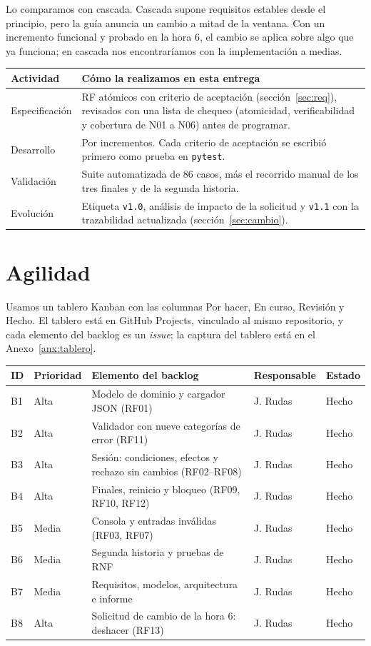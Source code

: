 \documentclass[11pt,letterpaper]{article}
\newcommand{\cod}[1]{\texttt{#1}}
\begin{document}
Lo comparamos con cascada. Cascada supone requisitos estables desde el principio, pero la guía anuncia un cambio a mitad de la ventana. Con un incremento funcional y probado en la hora 6, el cambio se aplica sobre algo que ya funciona; en cascada nos encontraríamos con la implementación a medias.

\begin{tabularx}{\linewidth}{@{}lL@{}}
\toprule
Actividad & Cómo la realizamos en esta entrega\\ \midrule
Especificación & RF atómicos con criterio de aceptación (sección~\ref{sec:req}), revisados con una lista de chequeo (atomicidad, verificabilidad y cobertura de N01 a N06) antes de programar.\\
Desarrollo & Por incrementos. Cada criterio de aceptación se escribió primero como prueba en \cod{pytest}.\\
Validación & Suite automatizada de 86 casos, más el recorrido manual de los tres finales y de la segunda historia.\\
Evolución & Etiqueta \cod{v1.0}, análisis de impacto de la solicitud y \cod{v1.1} con la trazabilidad actualizada (sección~\ref{sec:cambio}).\\ \bottomrule
\end{tabularx}

\section{Agilidad}
Usamos un tablero Kanban con las columnas Por hacer, En curso, Revisión y Hecho. El tablero está en GitHub Projects, vinculado al mismo repositorio, y cada elemento del backlog es un \textit{issue}; la captura del tablero está en el Anexo~\ref{anx:tablero}.

\begin{tabularx}{\linewidth}{@{}llLll@{}}
\toprule
ID & Prioridad & Elemento del backlog & Responsable & Estado\\ \midrule
B1 & Alta & Modelo de dominio y cargador JSON (RF01) & J. Rudas & Hecho\\
B2 & Alta & Validador con nueve categorías de error (RF11) & J. Rudas & Hecho\\
B3 & Alta & Sesión: condiciones, efectos y rechazo sin cambios (RF02--RF08) & J. Rudas & Hecho\\
B4 & Alta & Finales, reinicio y bloqueo (RF09, RF10, RF12) & J. Rudas & Hecho\\
B5 & Media & Consola y entradas inválidas (RF03, RF07) & J. Rudas & Hecho\\
B6 & Media & Segunda historia y pruebas de RNF & J. Rudas & Hecho\\
B7 & Media & Requisitos, modelos, arquitectura e informe & J. Rudas & Hecho\\
B8 & Alta & Solicitud de cambio de la hora 6: deshacer (RF13) & J. Rudas & Hecho\\ \bottomrule
\end{tabularx}
\end{document}

